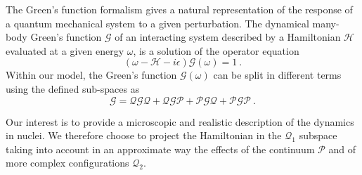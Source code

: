 \documentclass[12pt,a4paper,final]{iopart}
\begin{document}
The Green's function formalism gives a natural representation of the response of a quantum mechanical system to a given perturbation. The dynamical many-body Green's function $\mathcal{G}$ of an interacting system described by a Hamiltonian $\mathcal{H}$ evaluated at a given energy $\omega$, is a solution of the operator equation 
\begin{equation}
(\omega-\mathcal{H}-i\epsilon)\mathcal{G}(\omega) = 1 \ .
\label{g}
\end{equation}
Within our model, the Green's function $\mathcal{G}(\omega)$ can be split in different terms using the defined sub-spaces as 
\begin{equation}
\mathcal{G}= \mathcal{Q}\mathcal{G}\mathcal{Q} + \mathcal{Q}\mathcal{G}\mathcal{P} + \mathcal{P}\mathcal{G}\mathcal{Q} + \mathcal{P}\mathcal{G}\mathcal{P} \ .
\end{equation}

Our interest is to provide a microscopic and realistic description of the dynamics in nuclei. We therefore choose to project the Hamiltonian in the $\mathcal{Q}_1$ subspace taking into account in an approximate way the effects of the continuum $\mathcal{P}$ and of more complex configurations $\mathcal{Q}_2$. 
\end{document}
